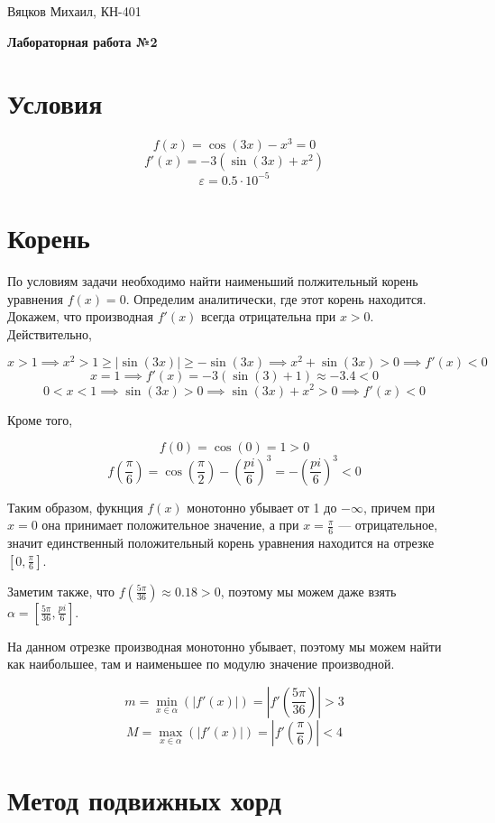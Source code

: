 \documentclass[11pt,a4paper,oneside]{article}
\begin{document}
\begin{center}
	{Вяцков Михаил, КН-401}
	
	{\huge \bf Лабораторная работа №2}
\end{center}

\section{Условия}

$$ f(x) = \cos(3x) - x^3 = 0 $$
$$ f'(x) = -3 (\sin(3x) + x^2) $$
$$ \varepsilon = 0.5 \cdot 10^{-5} $$

\section{Корень}

По условиям задачи необходимо найти наименьший полжительный корень уравнения $f(x) = 0$. Определим аналитически, где этот корень находится. Докажем, что производная $f'(x)$ всегда отрицательна при $x > 0$. Действительно,

$$ x > 1 \implies x^2 > 1 \ge |\sin(3x)| \ge - \sin(3x) \implies x^2 + \sin(3x) > 0
	\implies f'(x) < 0 $$
$$ x = 1 \implies f'(x) = -3 (\sin(3) + 1) \approx -3.4 < 0 $$
$$ 0 < x < 1 \implies \sin(3x) > 0 \implies \sin(3x) + x^2 > 0 \implies f'(x) < 0 $$

Кроме того,

$$ f(0) = \cos(0) = 1 > 0 $$
$$ f\left(\frac{\pi}{6}\right) = \cos\left(\frac{\pi}{2}\right) - \left(\frac{pi}{6}\right)^3
	= - \left(\frac{pi}{6}\right)^3 < 0 $$
	
Таким образом, фукнция $f(x)$ монотонно убывает от 1 до $-\infty$, причем при $x = 0$ она принимает положительное значение, а при $x = \frac{\pi}{6}$ --- отрицательное, значит единственный положительный корень уравнения находится на отрезке $[0, \frac{\pi}{6}]$.

Заметим также, что $f(\frac{5 \pi}{36}) \approx 0.18 > 0$, поэтому мы можем даже взять $\alpha = [\frac{5 \pi}{36}, \frac{pi}{6}]$.

На данном отрезке производная монотонно убывает, поэтому мы можем найти как наибольшее, там и наименьшее по модулю значение производной.

$$ m = \min_{x \in \alpha}(|f'(x)|) = \left|f'\left(\frac{5 \pi}{36}\right)\right| > 3 $$
$$ M = \max_{x \in \alpha}(|f'(x)|) = \left|f'\left(\frac{\pi}{6}\right)\right| < 4 $$

\section{Метод подвижных хорд}
\end{document}
